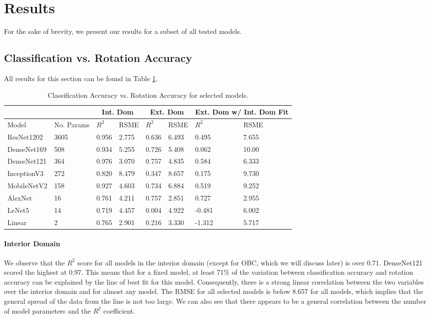 \documentclass{article}
\begin{document}
\section{Results}
For the sake of brevity, we present our results for a subset of all tested models.
\subsection{Classification vs. Rotation Accuracy}
All results for this section can be found in Table \ref{tbl:cavra}.
\begin{table}[t]
  \centering
  \caption{Classification Accuracy vs. Rotation Accuracy for selected models.}\label{tbl:cavra}
  \begin{tabular}{llllllll}
  \cline{1-8}
  \multicolumn{2}{c}{}           & \multicolumn{2}{c}{Int. Dom}     & \multicolumn{2}{c}{Ext. Dom}          & \multicolumn{2}{c}{Ext. Dom w/ Int. Dom Fit}            \\ \hline
  Model & No. Params & $R^2$ & RSME & $R^2$ & RSME & $R^2$ & RSME \\ \hline
  ResNet1202   &   3605   &  0.956  &   2.775   &    0.636     &   6.493   &    0.495      &   7.655   \\ 
  DenseNet169   &   508   &  0.934  &   5.255   &    0.726     &   5.408   &    0.062      &   10.00   \\ 
  DenseNet121   &   364   &  0.976  &   3.070   &    0.757     &   4.835   &    0.584      &   6.333   \\ 
  InceptionV3   &   272   &  0.820  &   8.479   &    0.347     &   8.657   &    0.175      &   9.730   \\ 
  MobileNetV2   &   158   &  0.927  &   4.603   &    0.734     &   6.884   &    0.519      &   9.252   \\ 
  AlexNet       &    16   &  0.761  &   4.211   &    0.757     &   2.851   &    0.727      &   2.955   \\ 
  LeNet5        &    14   &  0.719  &   4.457   &    0.004     &   4.922   &    -0.481     &   6.002   \\ 
  Linear        &     2   &  0.765  &   2.901   &    0.216     &   3.330   &    -1.312     &   5.717   \\ \hline
  \end{tabular}
\end{table}
\paragraph{Interior Domain} We observe that the $R^2$ score for all models in the interior domain (except for OBC, which we will discuss later) is over 0.71. DenseNet121 scored the highest at 0.97. This means that for a fixed model, at least 71\% of the variation between classification accuracy and rotation accuracy can be explained by the line of best fit for this model. Consequently, there is a strong linear correlation between the two variables over the interior domain and for almost any model. The RMSE for all selected models is below 8.657 for all models, which implies that the general spread of the data from the line is not too large. We can also see that there appears to be a general correlation between the number of model parameters and the $R^2$ coefficient. 
\end{document}
